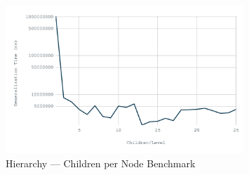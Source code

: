 \begin{figure}[H]
    \centering
    \includegraphics[width=0.8\textwidth]{images/hierarchy-children.png}
    \caption{Hierarchy --- Children per Node Benchmark}\label{fig:hierarchy_children_bm}
\end{figure}